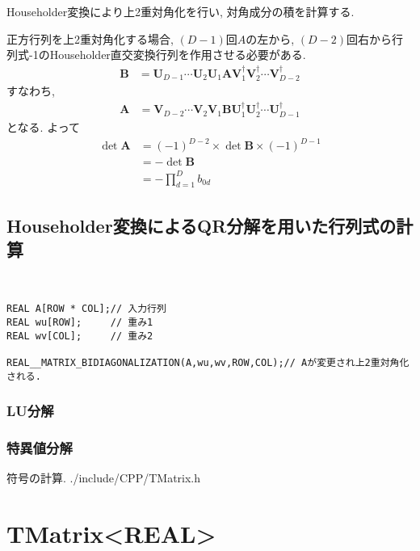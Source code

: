 \documentclass[a4j]{jsarticle}
\begin{document}
Householder変換により上2重対角化を行い, 対角成分の積を計算する. 

正方行列を上2重対角化する場合, 
$(D-1)$回$A$の左から, $(D-2)$回右から行列式-1のHouseholder直交変換行列を作用させる必要がある. 
\begin{align}
\bm{B}&=\bm{U}_{D-1}\cdots \bm{U}_{2}\bm{U}_{1}\bm{A}\bm{V}_{1}^{\dag}\bm{V}_{2}^{\dag}\cdots \bm{V}_{D-2}^{\dag}
\end{align}
すなわち, 
\begin{align}
\bm{A}&=\bm{V}_{D-2}\cdots \bm{V}_{2}\bm{V}_{1}\bm{B}\bm{U}_{1}^{\dag}\bm{U}_{2}^{\dag}\cdots \bm{U}_{D-1}^{\dag}
\end{align}
となる. よって
\begin{align}
\det \bm{A}&=(-1)^{D-2}\times \det \bm{B}\times (-1)^{D-1}\nonumber\\
&=-\det \bm{B}\nonumber\\
&=-\prod _{d=1}^{D}b_{0d}
\end{align}

\subsection{Householder変換によるQR分解を用いた行列式の計算}

\begin{lstlisting}[caption=上2重対角化,label=ほげ]


REAL A[ROW * COL];// 入力行列
REAL wu[ROW];     // 重み1
REAL wv[COL];     // 重み2

REAL__MATRIX_BIDIAGONALIZATION(A,wu,wv,ROW,COL);// Aが変更され上2重対角化される. 

\end{lstlisting}


\subsubsection{LU分解}
\subsubsection{特異値分解}
符号の計算. 
./include/CPP/TMatrix.h




\section{TMatrix<REAL>}




\end{document}
